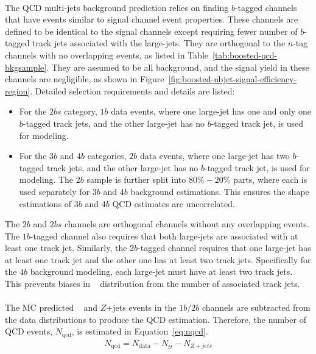 \paragraph{}
The QCD multi-jets background prediction relies on finding $b$-tagged channels that have events similar to signal channel event properties.
These channels are defined to be identical to the signal channels except requiring fewer number of $b$-tagged track jets associated with the large-\R jets.
They are orthogonal to the $n$-tag channels with no overlapping events, as listed in Table~\ref{tab:boosted-qcd-bkgsample}.
They are assumed to be all background, and the signal yield in these channels are negligible, as shown in Figure~\ref{fig:boosted-nbjet-signal-efficiency-region}.
Detailed selection requirements and details are listed:
\begin{itemize}
  \item For the $2bs$ category, $1b$ data events, where one large-\R jet has one and only one $b$-tagged track jets, and the other large-\R jet has no $b$-tagged track jet, is used for modeling.
  \item For the $3b$ and $4b$ categories, $2b$ data events, where one large-\R jet has two $b$-tagged track jets, and the other large-\R jet has no $b$-tagged track jet, is used for modeling. The $2b$ sample is further split into $80\%-20\%$ parts, where each is used separately for $3b$ and $4b$ background estimations. This ensures the shape estimations of $3b$ and $4b$ QCD estimates are uncorrelated. 
\end{itemize}
The $2b$ and $2bs$ channels are orthogonal channels without any overlapping events.
The $1b$-tagged channel also requires that both large-\R jets are associated with at least one track jet. 
Similarly, the $2b$-tagged channel requires that one large-\R jet has at least one track jet and the other one has at least two track jets.  
Specifically for the $4b$ background modeling, each large-\R jet must have at least two track jets. 
This prevents biases in \mtwoJ~ distribution from the number of associated track jets.

\paragraph{}
The MC predicted \ttbar~ and $Z$+jets events in the $1b/2b$ channels are subtracted from the data distributions to produce the QCD estimation. 
Therefore, the number of QCD events, $N_{\text{qcd}}$, is estimated in Equation~\ref{eq:nqcd}.
\begin{eqnarray}
\label{eq:nqcd}
N_{\text{qcd}} = N_{\text{data}} - N_{t\bar{t}} - N_{Z+jets} 
\end{eqnarray}

